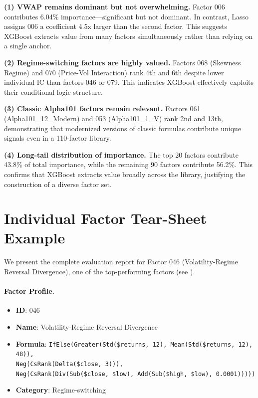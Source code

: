 \documentclass[sigconf]{acmart}
\begin{document}
\textbf{(1) VWAP remains dominant but not overwhelming.}
Factor 006 contributes 6.04\% importance---significant but not dominant.
In contrast, Lasso assigns 006 a coefficient 4.5x larger than the second factor.
This suggests XGBoost extracts value from many factors simultaneously rather than relying on a single anchor.

\textbf{(2) Regime-switching factors are highly valued.}
Factors 068 (Skewness Regime) and 070 (Price-Vol Interaction) rank 4th and 6th despite lower individual IC than factors 046 or 079.
This indicates XGBoost effectively exploits their conditional logic structure.

\textbf{(3) Classic Alpha101 factors remain relevant.}
Factors 061 (Alpha101\_12\_Modern) and 053 (Alpha101\_1\_V) rank 2nd and 13th, demonstrating that modernized versions of classic formulas contribute unique signals even in a 110-factor library.

\textbf{(4) Long-tail distribution of importance.}
The top 20 factors contribute 43.8\% of total importance, while the remaining 90 factors contribute 56.2\%.
This confirms that XGBoost extracts value broadly across the library, justifying the construction of a diverse factor set.

\section{Individual Factor Tear-Sheet Example}
\label{app:tearsheet}

We present the complete evaluation report for Factor 046 (Volatility-Regime Reversal Divergence), one of the top-performing factors (see ).

\paragraph{Factor Profile.}
{\setlength{\leftmargini}{1.4em}%
\begin{itemize}
  \item \textbf{ID}: 046
  \item \textbf{Name}: Volatility-Regime Reversal Divergence
  \item \textbf{Formula}:
    \texttt{IfElse(Greater(Std(\$returns, 12), Mean(Std(\$returns, 12), 48)),}\\
    \hspace*{\parindent}\texttt{Neg(CsRank(Delta(\$close, 3))),}\\
    \hspace*{\parindent}\texttt{Neg(CsRank(Div(Sub(\$close, \$low), Add(Sub(\$high, \$low), 0.0001)))))}
  \item \textbf{Category}: Regime-switching
\end{itemize}
}
\end{document}
